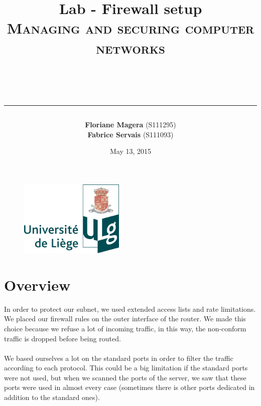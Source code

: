 \documentclass[a4paper,titlepage]{article}
\begin{document}
\begin{titlepage}

\begin{figure}
\centering
\includegraphics[width=5cm]{logo-ulg.png}
\end{figure}



\title{
\vspace{0.2cm}
\LARGE{\textbf{Lab - Firewall setup }} \\ \textsc{Managing and securing computer networks}
\author{\textbf{Floriane Magera} \small{(S111295})\\\textbf{Fabrice Servais} \small{(S111093})}\\
\date{May 13, 2015}
\rule{15cm}{1.5pt}
}

\end{titlepage}

\pagestyle{fancy}

\maketitle

\section{Overview}
In order to protect our subnet, we used extended access lists and rate limitations. We placed our firewall rules on the outer interface of the router. We made this choice because we refuse a lot of incoming traffic, in this way, the non-conform traffic is dropped before being routed.

\paragraph{}
 We based ourselves a lot on the standard ports in order to filter the traffic according to each protocol.  This could be a big  limitation if the standard ports were not used, but when we scanned the ports of the server, we saw that these ports were used in almost every case (sometimes there is other ports dedicated in addition to the standard ones).
\end{document}
